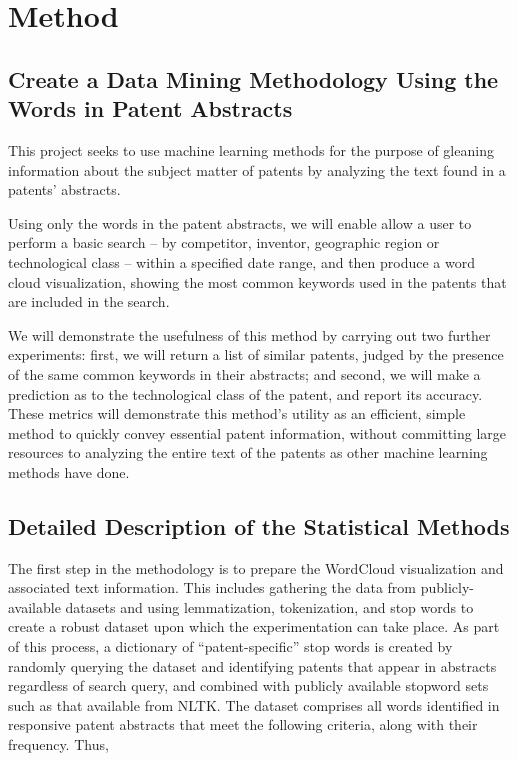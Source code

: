 \documentclass{article}
\begin{document}
\section{Method}
\label{method}

\subsection{Create a Data Mining Methodology Using the Words in Patent Abstracts}
This project seeks to use machine learning methods for the purpose of gleaning information about the subject matter of patents by analyzing the text found in a patents’ abstracts.  

Using only the words in the patent abstracts, we will enable allow a user to perform a basic search – by competitor, inventor, geographic region or technological class – within a specified date range, and then produce a word cloud visualization, showing the most common keywords used in the patents that are included in the search.  

We will demonstrate the usefulness of this method  by carrying out two further experiments: first, we will return a list of similar patents, judged by the presence of the same common keywords in their abstracts; and second, we will make a prediction as to the technological class of the patent, and report its accuracy.  These metrics will demonstrate this method’s utility as an efficient, simple method to quickly convey essential patent information, without committing large resources to analyzing the entire text of the patents as other machine learning methods have done.

\subsection{Detailed Description of the Statistical Methods}
The first step in the methodology is to prepare the WordCloud visualization and associated text information.  This includes gathering the data from publicly-available datasets and using lemmatization, tokenization, and stop words to create a robust dataset upon which the experimentation can take place.  As part of this process, a dictionary of “patent-specific” stop words is created by randomly querying the dataset and identifying patents that appear in abstracts regardless of search query, and combined with publicly available stopword sets such as that available from NLTK.  The dataset comprises all words identified in responsive patent abstracts that meet the following criteria, along with their frequency.  Thus,
\end{document}
